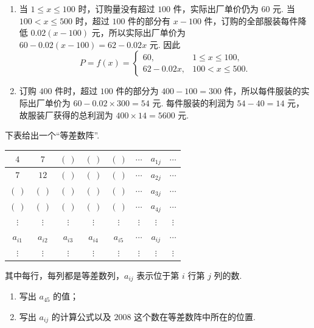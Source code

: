 \begin{solution}
\begin{enumerate}
\item 当 \(1\leq x\leq100\) 时，订购量没有超过 \(100\) 件，实际出厂单价仍为 \(60\) 元. 当 \(100<x\leq500\) 时，超过 \(100\) 件的部分有 \(x-100\) 件，订购的全部服装每件降低 \(0.02\left(x-100\right)\) 元，所以实际出厂单价为 \(60-0.02\left(x-100\right)=62-0.02x\) 元. 因此
\[
P=f(x)=
\begin{cases}
60, & 1\leq x\leq100,\\
62-0.02x, & 100<x\leq500.
\end{cases}
\]

\item 订购 \(400\) 件时，超过 \(100\) 件的部分为 \(400-100=300\) 件，所以每件服装的实际出厂单价为 \(60-0.02\times300=54\) 元. 每件服装的利润为 \(54-40=14\) 元，故服装厂获得的总利润为 \(400\times14=5600\) 元.
\end{enumerate}
\end{solution}

\begin{problem}
下表给出一个“等差数阵”.

\begin{center}
\renewcommand{\arraystretch}{1.15}
\begin{tabular}{|c|c|c|c|c|c|c|c|}
\hline
\(4\)&\(7\)&\(\left(\ \right)\)&\(\left(\ \right)\)&\(\left(\ \right)\)&\(\cdots\)&\(a_{1j}\)&\(\cdots\)\\ \hline
\(7\)&\(12\)&\(\left(\ \right)\)&\(\left(\ \right)\)&\(\left(\ \right)\)&\(\cdots\)&\(a_{2j}\)&\(\cdots\)\\ \hline
\(\left(\ \right)\)&\(\left(\ \right)\)&\(\left(\ \right)\)&\(\left(\ \right)\)&\(\left(\ \right)\)&\(\cdots\)&\(a_{3j}\)&\(\cdots\)\\ \hline
\(\left(\ \right)\)&\(\left(\ \right)\)&\(\left(\ \right)\)&\(\left(\ \right)\)&\(\left(\ \right)\)&\(\cdots\)&\(a_{4j}\)&\(\cdots\)\\ \hline
\(\vdots\)&\(\vdots\)&\(\vdots\)&\(\vdots\)&\(\vdots\)&\(\vdots\)&\(\vdots\)&\(\vdots\)\\ \hline
\(a_{i1}\)&\(a_{i2}\)&\(a_{i3}\)&\(a_{i4}\)&\(a_{i5}\)&\(\cdots\)&\(a_{ij}\)&\(\cdots\)\\ \hline
\(\vdots\)&\(\vdots\)&\(\vdots\)&\(\vdots\)&\(\vdots\)&\(\vdots\)&\(\vdots\)&\(\vdots\)\\ \hline
\end{tabular}
\end{center}
其中每行，每列都是等差数列，\(a_{ij}\) 表示位于第 \(i\) 行第 \(j\) 列的数.

\begin{enumerate}
\item 写出 \(a_{45}\) 的值；
\item 写出 \(a_{ij}\) 的计算公式以及 \(2008\) 这个数在等差数阵中所在的位置.
\end{enumerate}
\end{problem}

